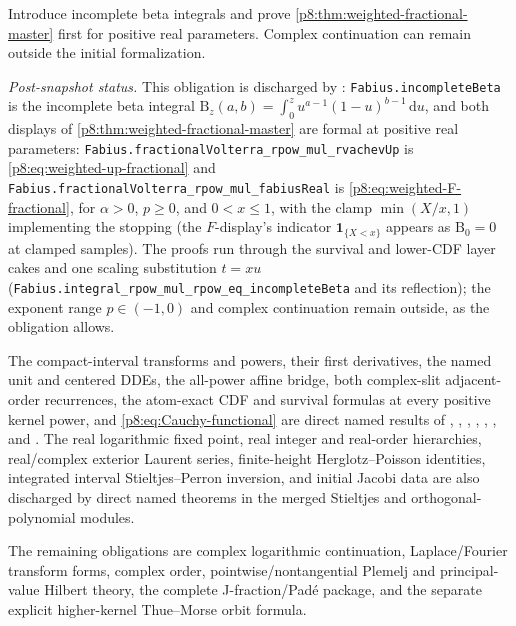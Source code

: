 \documentclass[11pt,oneside]{article}
\theoremstyle{definition}
\theoremstyle{remark}
\newcommand{\dd}{\,\mathrm d}
\newcommand{\1}{\mathbf 1}
\begin{document}
\begin{obligation}
Introduce incomplete beta integrals and prove
\cref{p8:thm:weighted-fractional-master} first for positive real parameters.
Complex continuation can remain outside the initial formalization.
\end{obligation}

\emph{Post-snapshot status.}  This obligation is discharged by
: \nolinkurl{Fabius.incompleteBeta} is the incomplete
beta integral $\mathrm B_z(a,b)=\int_0^z u^{a-1}(1-u)^{b-1}\dd u$, and both displays of
\cref{p8:thm:weighted-fractional-master} are formal at positive real parameters:
\nolinkurl{Fabius.fractionalVolterra\_rpow\_mul\_rvachevUp} is
\eqref{p8:eq:weighted-up-fractional} and
\nolinkurl{Fabius.fractionalVolterra\_rpow\_mul\_fabiusReal} is
\eqref{p8:eq:weighted-F-fractional}, for $\alpha>0$, $p\ge0$, and $0<x\le1$, with the
clamp $\min(X/x,1)$ implementing the stopping (the $F$-display's indicator
$\mathbf 1_{\{X<x\}}$ appears as $\mathrm B_0=0$ at clamped samples).  The proofs run
through the survival and lower-CDF layer cakes and one scaling substitution $t=xu$
(\nolinkurl{Fabius.integral\_rpow\_mul\_rpow\_eq\_incompleteBeta} and its reflection);
the exponent range $p\in(-1,0)$ and complex continuation remain outside, as the
obligation allows.

\begin{obligation}
The compact-interval transforms and powers, their first derivatives, the named unit and
centered DDEs, the all-power affine bridge, both complex-slit adjacent-order recurrences,
the atom-exact CDF and survival formulas at every positive kernel power, and
\eqref{p8:eq:Cauchy-functional} are direct named results of
, ,
, ,
, , and
.  The real logarithmic fixed point, real integer and
real-order hierarchies, real/complex exterior Laurent series, finite-height
Herglotz--Poisson identities, integrated interval Stieltjes--Perron inversion, and initial
Jacobi data are also discharged by direct named theorems in the merged Stieltjes and
orthogonal-polynomial modules.

The remaining obligations are complex logarithmic continuation, Laplace/Fourier transform
forms, complex order, pointwise/nontangential Plemelj and principal-value Hilbert theory,
the complete J-fraction/Pad\'e package, and the separate explicit higher-kernel
Thue--Morse orbit formula.
\end{obligation}
\end{document}
